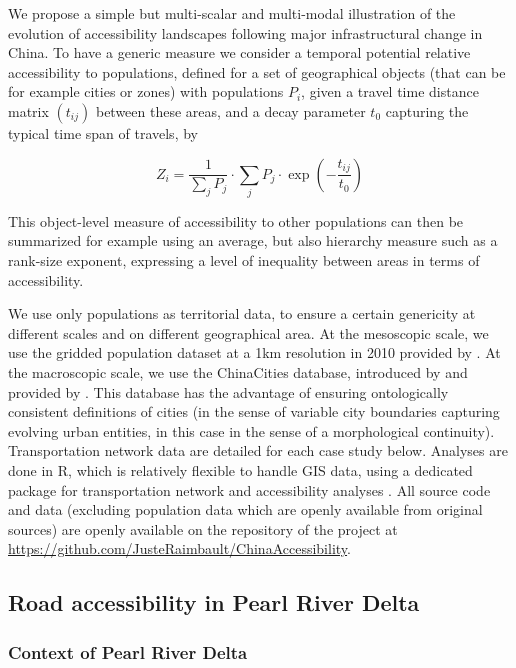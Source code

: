 We propose a simple but multi-scalar and multi-modal illustration of the evolution of accessibility landscapes following major infrastructural change in China. To have a generic measure we consider a temporal potential relative accessibility to populations, defined for a set of geographical objects (that can be for example cities or zones) with populations $P_i$, given a travel time distance matrix $(t_{ij})$ between these areas, and a decay parameter $t_0$ capturing the typical time span of travels, by

\[
Z_i = \frac{1}{\sum_j P_j} \cdot \sum_j P_j \cdot \exp{\left(- \frac{t_{ij}}{t_0}\right)}
\]

This object-level measure of accessibility to other populations can then be summarized for example using an average, but also hierarchy measure such as a rank-size exponent, expressing a level of inequality between areas in terms of accessibility.

We use only populations as territorial data, to ensure a certain genericity at different scales and on different geographical area. At the mesoscopic scale, we use the gridded population dataset at a 1km resolution in 2010 provided by \cite{fu2014grid}. At the macroscopic scale, we use the ChinaCities database, introduced by \cite{swerts2013systemes} and provided by \cite{swerts2017database}. This database has the advantage of ensuring ontologically consistent definitions of cities (in the sense of variable city boundaries capturing evolving urban entities, in this case in the sense of a morphological continuity). Transportation network data are detailed for each case study below. Analyses are done in R, which is relatively flexible to handle GIS data, using a dedicated package for transportation network and accessibility analyses \citep{raimbault2018trpackage}. All source code and data (excluding population data which are openly available from original sources) are openly available on the repository of the project at \url{https://github.com/JusteRaimbault/ChinaAccessibility}.





\subsection{Road accessibility in Pearl River Delta}

\subsubsection{Context of Pearl River Delta}

